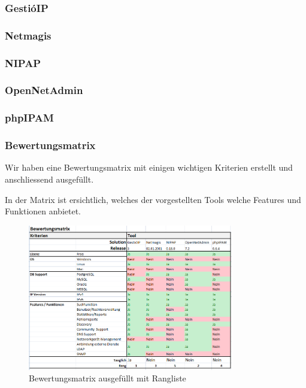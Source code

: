 \documentclass[11pt,a4paper,parskip=half]{scrartcl}
\begin{document}
\subsubsection{GestióIP}
\subsubsection{Netmagis}
\subsubsection{NIPAP}
\subsubsection{OpenNetAdmin}
\subsubsection{phpIPAM}
\subsubsection{Bewertungsmatrix}
Wir haben eine Bewertungsmatrix mit einigen wichtigen Kriterien erstellt und anschliessend ausgefüllt.

In der Matrix ist ersichtlich, welches der vorgestellten Tools welche Features und Funktionen anbietet.
\begin{figure}[H]
\centering
\includegraphics[width=0.8\textwidth]{Phase3/Matrix_1.png}
\caption{Bewertungsmatrix ausgefüllt mit Rangliste}
\label{fig:matrix_1}
\end{figure}
\end{document}
